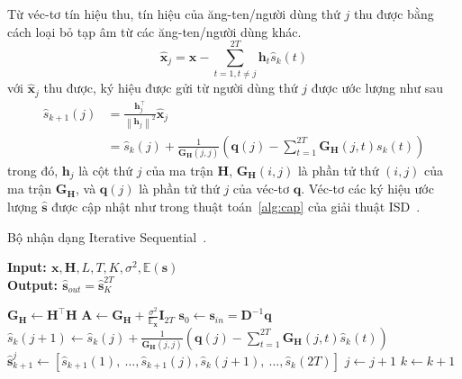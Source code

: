 Từ véc-tơ tín hiệu thu, tín hiệu của ăng-ten/người dùng thứ $j$ thu được bằng cách loại bỏ tạp âm từ các ăng-ten/người dùng khác.
\begin{equation}
    \hat{\mathbf{x}}_j=\mathbf{x}-\sum_{t=1, t \neq j}^{2T} \mathbf{h}_t \hat{s}_k(t)
\end{equation}
với $\hat{\mathbf{x}}_j$ thu được, ký hiệu được gửi từ người dùng thứ $j$ được ước lượng như sau
\begin{equation}
\label{eq:supdate}
    \begin{aligned}
        \hat{s}_{k+1}(j) & =\frac{\mathbf{h}_j^\top}{\left\|\mathbf{h}_j\right\|^2} \hat{\mathbf{x}}_j \\ 
        & = \hat{s}_k(j)+\frac{1}{\mathbf{G}_\mathbf{H}(j, j)}\left(\mathbf{q}(j)-\sum_{t=1}^{2T} \mathbf{G}_\mathbf{H}(j, t) s_k(t)\right)
    \end{aligned}
\end{equation}
trong đó, $\mathbf{h}_j$ là cột thứ $j$ của ma trận $\mathbf{H}$, $\mathbf{G}_\mathbf{H}(i, j)$ là phần tử thứ $(i, j)$ của ma trận $\mathbf{G}_\mathbf{H}$, và $\mathbf{q}(j)$ là phần tử thứ $j$ của véc-tơ $\mathbf{q}$. Véc-tơ các ký hiệu ước lượng $\hat{\mathbf{s}}$ được cập nhật như trong thuật toán~\ref{alg:cap} của giải thuật ISD~\cite{Mandloi2017}. 
\begin{algorithm}[ht]
    \caption{Bộ nhận dạng Iterative Sequential~\cite{Mandloi2017}.}\label{alg:cap}
    \hspace*{\algorithmicindent} \textbf{Input: $\mathbf{x}, \mathbf{H}, L, T, K, \sigma^2, \mathbb{E}(\mathbf{s})$} \\
    \hspace*{\algorithmicindent} \textbf{Output: $\hat{\mathbf{s}}_{out} = \hat{\mathbf{s}}^{2T}_K$} 
    \begin{algorithmic}[1]
        \State $\mathbf{G}_\mathbf{H} \leftarrow \mathbf{H}^\top \mathbf{H}$
        \State $\mathbf{A} \leftarrow \mathbf{G}_\mathbf{H} + \frac{\sigma^2}{\mathbb{E}_\mathbf{x}} \mathbf{I}_{2T}$
        \State $\mathbf{s}_0 \leftarrow \mathbf{s}_{in} = \mathbf{D}^{-1} \mathbf{q}$ \\
                \State $\hat{s}_k(j+1) \leftarrow \hat{s}_k(j)+\frac{1}{\mathbf{G}_\mathbf{H}(j, j)}\left(\mathbf{q}(j)-\sum_{t=1}^{2T} \mathbf{G}_\mathbf{H}(j, t) \hat{s}_k(t)\right)$ \\ 
                \State $\hat{\mathbf{s}}_{k+1}^j \leftarrow\left[\hat{s}_{k+1}(1),~\ldots, \hat{s}_{k+1}(j), \hat{s}_k(j+1),~\ldots, \hat{s}_k(2T)\right]$
                \State $j \leftarrow j + 1$
            \EndFor
            \State $k \leftarrow k + 1$
        \EndFor
    \end{algorithmic}
\end{algorithm}

